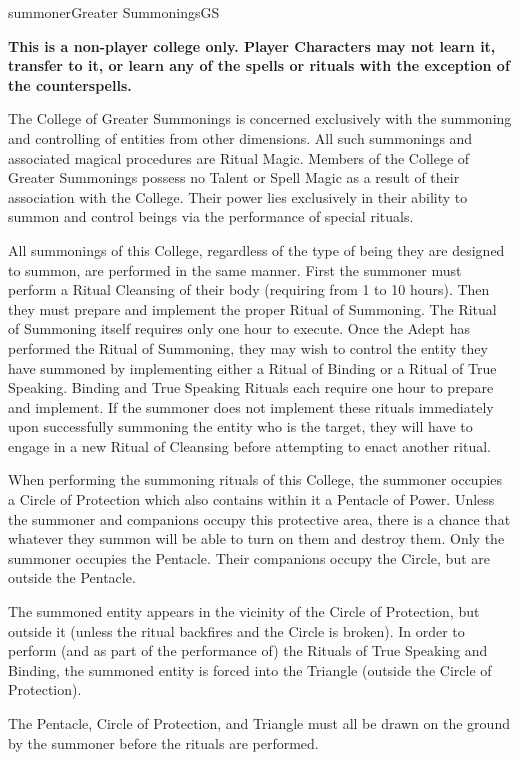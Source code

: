 \begin{college}[1.0]{summoner}{Greater Summonings}{GS}

\textbf{This is a non-player college only.  Player Characters may not
learn it, transfer to it, or learn any of the spells or rituals with
the exception of the counterspells.}

The College of Greater Summonings is concerned exclusively with the
summoning and controlling of entities from other dimensions.  All such
summonings and associated magical procedures are Ritual Magic.
Members of the College of Greater Summonings possess no Talent or
Spell Magic as a result of their association with the College.  Their
power lies exclusively in their ability to summon and control beings
via the performance of special rituals.

All summonings of this College, regardless of the type of being they
are designed to summon, are performed in the same manner.  First the
summoner must perform a Ritual Cleansing of their body (requiring from
1 to 10 hours).  Then they must prepare and implement the proper
Ritual of Summoning.  The Ritual of Summoning itself requires only one
hour to execute.  Once the Adept has performed the Ritual of
Summoning, they may wish to control the entity they have summoned by
implementing either a Ritual of Binding or a Ritual of True Speaking.
Binding and True Speaking Rituals each require one hour to prepare and
implement.  If the summoner does not implement these rituals
immediately upon successfully summoning the entity who is the target,
they will have to engage in a new Ritual of Cleansing before
attempting to enact another ritual.

When performing the summoning rituals of this College, the summoner
occupies a Circle of Protection which also contains within it a
Pentacle of Power.  Unless the summoner and companions occupy this
protective area, there is a chance that whatever they summon will be
able to turn on them and destroy them.  Only the summoner occupies the
Pentacle.  Their companions occupy the Circle, but are outside the
Pentacle.

The summoned entity appears in the vicinity of the Circle of
Protection, but outside it (unless the ritual backfires and the Circle
is broken).  In order to perform (and as part of the performance of)
the Rituals of True Speaking and Binding, the summoned entity is
forced into the Triangle (outside the Circle of Protection).

The Pentacle, Circle of Protection, and Triangle must all be drawn on
the ground by the summoner before the rituals are performed.


\end{college}
